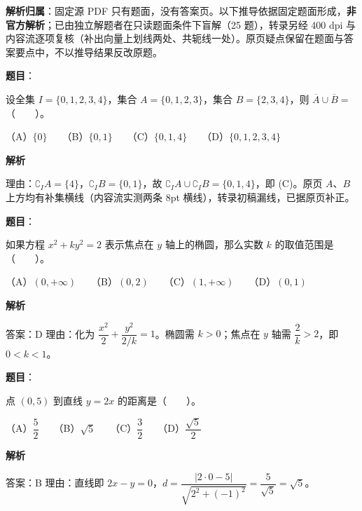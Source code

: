 

\begin{gknotice}
\textbf{解析归属}：固定源 PDF 只有题面，没有答案页。以下推导依据固定题面形成，\textbf{非官方解析}；已由独立解题者在只读题面条件下盲解（25 题），转录另经 400 dpi 与内容流逐项复核（补出向量上划线两处、共轭线一处）。原页疑点保留在题面与答案要点中，不以推导结果反改原题。
\end{gknotice}

\begin{answer}

\textbf{题目}：

设全集 $I=\{0,1,2,3,4\}$，集合 $A=\{0,1,2,3\}$，集合 $B=\{2,3,4\}$，则 $\overline{A}\cup\overline{B}=$\mbox{（　　）}。

（A）$\{0\}$　　（B）$\{0,1\}$　　（C）$\{0,1,4\}$　　（D）$\{0,1,2,3,4\}$

\textbf{解析}

理由：\(\complement_I A=\{4\}\)，\(\complement_I B=\{0,1\}\)，故 \(\complement_I A\cup\complement_I B=\{0,1,4\}\)，即 (C)。原页 \(A\)、\(B\) 上方均有补集横线（内容流实测两条 8pt 横线），转录初稿漏线，已据原页补正。


\end{answer}
\begin{answer}

\textbf{题目}：

如果方程 $x^2+ky^2=2$ 表示焦点在 $y$ 轴上的椭圆，那么实数 $k$ 的取值范围是\mbox{（　　）}。

（A）$(0,+\infty)$　　（B）$(0,2)$　　（C）$(1,+\infty)$　　（D）$(0,1)$

\textbf{解析}

答案：D
理由：化为 $\dfrac{x^2}{2}+\dfrac{y^2}{2/k}=1$。椭圆需 $k>0$；焦点在 $y$ 轴需 $\dfrac2k>2$，即 $0<k<1$。


\end{answer}
\begin{answer}

\textbf{题目}：

点 $(0,5)$ 到直线 $y=2x$ 的距离是\mbox{（　　）}。

（A）$\dfrac52$　　（B）$\sqrt5$　　（C）$\dfrac32$　　（D）$\dfrac{\sqrt5}{2}$

\textbf{解析}

答案：B
理由：直线即 $2x-y=0$，$d=\dfrac{|2\cdot0-5|}{\sqrt{2^2+(-1)^2}}=\dfrac{5}{\sqrt5}=\sqrt5$。


\end{answer}
